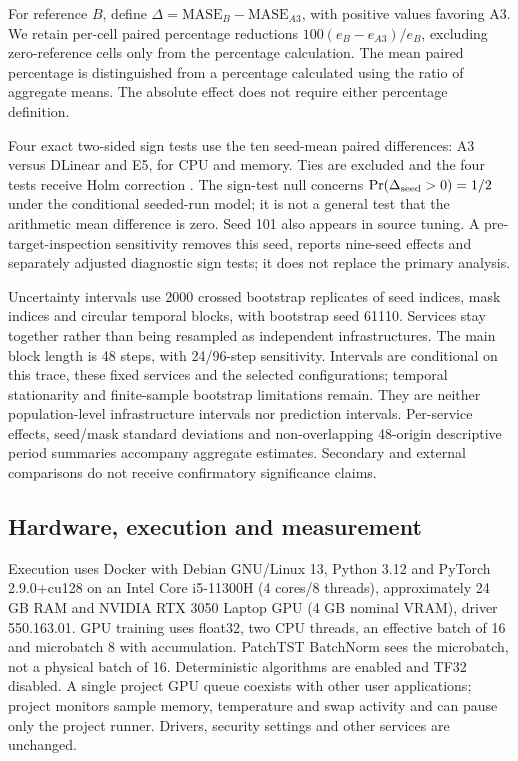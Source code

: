 For reference $B$, define $\Delta=\mathrm{MASE}_{B}-\mathrm{MASE}_{A3}$, with positive values favoring A3. We retain per-cell paired percentage reductions $100(e_B-e_{A3})/e_B$, excluding zero-reference cells only from the percentage calculation. The mean paired percentage is distinguished from a percentage calculated using the ratio of aggregate means. The absolute effect does not require either percentage definition.

Four exact two-sided sign tests use the ten seed-mean paired differences: A3 versus DLinear and E5, for CPU and memory. Ties are excluded and the four tests receive Holm correction \cite{holm}. The sign-test null concerns $\Pr(\Delta_{\rm seed}>0)=1/2$ under the conditional seeded-run model; it is not a general test that the arithmetic mean difference is zero. Seed 101 also appears in source tuning. A pre-target-inspection sensitivity removes this seed, reports nine-seed effects and separately adjusted diagnostic sign tests; it does not replace the primary analysis.

Uncertainty intervals use 2000 crossed bootstrap replicates of seed indices, mask indices and circular temporal blocks, with bootstrap seed 61110. Services stay together rather than being resampled as independent infrastructures. The main block length is 48 steps, with 24/96-step sensitivity. Intervals are conditional on this trace, these fixed services and the selected configurations; temporal stationarity and finite-sample bootstrap limitations remain. They are neither population-level infrastructure intervals nor prediction intervals. Per-service effects, seed/mask standard deviations and non-overlapping 48-origin descriptive period summaries accompany aggregate estimates. Secondary and external comparisons do not receive confirmatory significance claims.

\subsection{Hardware, execution and measurement}
Execution uses Docker with Debian GNU/Linux 13, Python 3.12 and PyTorch 2.9.0+cu128 on an Intel Core i5-11300H (4 cores/8 threads), approximately 24 GB RAM and NVIDIA RTX 3050 Laptop GPU (4 GB nominal VRAM), driver 550.163.01. GPU training uses float32, two CPU threads, an effective batch of 16 and microbatch 8 with accumulation. PatchTST BatchNorm sees the microbatch, not a physical batch of 16. Deterministic algorithms are enabled and TF32 disabled. A single project GPU queue coexists with other user applications; project monitors sample memory, temperature and swap activity and can pause only the project runner. Drivers, security settings and other services are unchanged.

